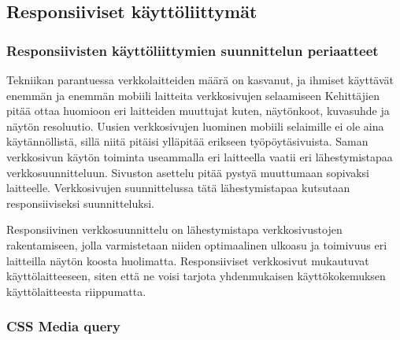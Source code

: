 \documentclass[11pt,a4paper,titlepage,oneside]{article}
\begin{document}
\newpage
\subsection{Responsiiviset käyttöliittymät}        %




\subsubsection{Responsiivisten käyttöliittymien suunnittelun periaatteet}




Tekniikan parantuessa verkkolaitteiden määrä on kasvanut, ja ihmiset käyttävät enemmän ja enemmän mobiili laitteita verkkosivujen selaamiseen 
Kehittäjien pitää ottaa huomioon eri laitteiden muuttujat kuten, näytönkoot, kuvasuhde ja näytön resoluutio.
Uusien verkkosivujen luominen mobiili selaimille ei ole aina käytännöllistä, sillä niitä pitäisi ylläpitää erikseen työpöytäsivuista.
Saman verkkosivun käytön toiminta useammalla eri laitteella vaatii eri lähestymistapaa verkkosuunnitteluun. 
Sivuston asettelu pitää pystyä muuttumaan sopivaksi laitteelle.
Verkkosivujen suunnittelussa tätä lähestymistapaa kutsutaan responsiiviseksi suunnitteluksi. 
\medskip



Responsiivinen verkkosuunnittelu on lähestymistapa verkkosivustojen rakentamiseen,
jolla varmistetaan niiden optimaalinen ulkoasu ja toimivuus eri laitteilla näytön koosta huolimatta. 
Responsiiviset verkkosivut mukautuvat käyttölaitteeseen, siten että ne voisi tarjota yhdenmukaisen käyttökokemuksen käyttölaitteesta riippumatta.
\medskip





\subsubsection{CSS Media query}


\end{document}
